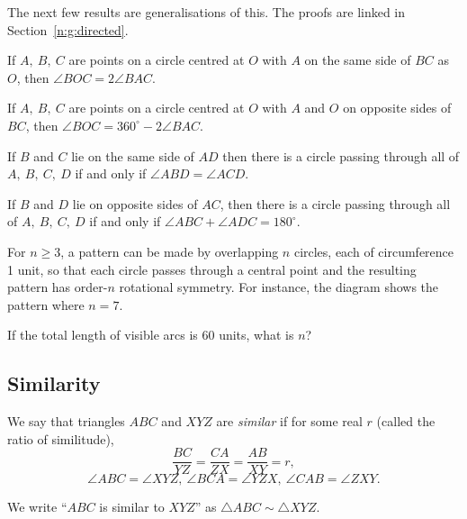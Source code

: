 The next few results are generalisations of this. The proofs are linked in
Section~\ref{n:g:directed}.
\begin{result}{\label{r:b:g:ci:2}}
  If $A,\ B,\ C$ are points on a circle centred at $O$ with $A$ on the same side
  of $BC$ as $O$, then $\angle BOC=2\angle BAC$.
\end{result}
\begin{result}{\label{r:b:g:ci:3}}
  If $A,\ B,\ C$ are points on a circle centred at $O$ with $A$ and $O$ on
  opposite sides of $BC$, then $\angle BOC=360^\circ-2\angle BAC$.
\end{result}
\begin{result}{\label{r:b:g:ci:4}}
  If $B$ and $C$ lie on the same side of $AD$ then there is a circle passing
  through all of $A,\ B,\ C,\ D$ if and only if $\angle ABD=\angle ACD$.
\end{result}
\begin{result}{\label{r:b:g:ci:5}}
  If $B$ and $D$ lie on opposite sides of $AC$, then there is a circle passing
  through all of $A,\ B,\ C,\ D$ if and only if $\angle ABC+\angle
  ADC=180^\circ$.
\end{result}
\begin{problem}{\label{p:b:g:ci:1}}
  For $n\ge 3$, a pattern can be made by overlapping $n$ circles, each of
  circumference 1 unit, so that each circle passes through a central point and
  the resulting pattern has order-$n$ rotational symmetry. For instance, the
  diagram shows the pattern where $n=7$.

  If the total length of visible arcs is 60 units, what is $n$?
\end{problem}
\subsection{Similarity}
  We say that triangles $ABC$ and $XYZ$ are \emph{similar} if for some real $r$
  (called the ratio of similitude),
      \[\frac{BC}{YZ}=\frac{CA}{ZX}=\frac{AB}{XY}=r,\]
      \[\angle ABC=\angle XYZ,\
      \angle BCA=\angle YZX,\ \angle CAB=\angle ZXY.\]

    We write ``$ABC$ is similar to $XYZ$'' as $\triangle ABC\sim\triangle XYZ$.

